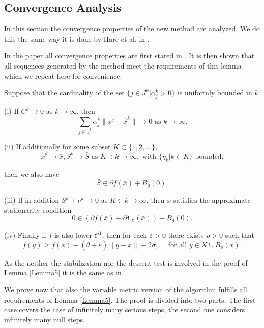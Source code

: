 \vspace{1.5em}


\subsection{Convergence Analysis}

In this section the convergence properties of the new method are analyzed. We do this the same way it is done by Hare et al. in \cite{Hare2016}.

In the paper all convergence properties are first stated in \cite[Lemma 5]{Hare2016}. It is then shown that all sequences generated by the method meet the requirements of this lemma which we repeat here for convenience.

\begin{lemma}\label{Lemma5}
	Suppose that the cardinality of the set \(\{j \in J^k| \alpha_j^k > 0\}\) is uniformly bounded in \(k\).
	
	(i) If \(C^k \to 0\) as \(k \to \infty\), then 
	\[ \sum_{j \in J^k}\alpha_j^k\|x^j-\hat{x}^k\| \to 0 \text{ as } k \to \infty. \]
	
	(ii) If additionally for some subset \(K \subset \{1,2,\dots\}\),
	\[\hat{x}^k \to \bar{x}, S^k \to \bar{S} \text{ as } K \ni k \to \infty, \text{ with } \{\eta_k|k \in K\} \text{ bounded,} \]
	
	then we also have 
	\[\bar{S} \in \partial f(\bar{x})+B_{\bar{\theta}}(0).\]
	
	(iii) If in addition \(S^k + \nu^k \to 0\) as \(K \in k \to \infty\), then \(\bar{x}\) satisfies the approximate stationarity condition 
	\begin{equation}
		0 \in \left(\partial f(\bar{x}) + \partial \mathtt{i}_X(\bar{x}) \right) + B_{\bar{\theta}}(0).
	\end{equation}
	
	(iv) Finally if \(f\) is also lower-\(\mathcal{C}^1\), then for each \(\varepsilon > 0\) there exists \(\rho > 0\) such that
	\begin{equation}
		f(y) \geq f(\bar{x})-(\bar{\theta}+\varepsilon)\|y-\bar{x}\|-2\bar{\sigma}, \quad \text{ for all } y \in X\cup B_{\rho}(\bar{x}).
	\end{equation}
\end{lemma}

As the neither the stabilization nor the descent test is involved in the proof of Lemma \ref{Lemma5} it is the same as in \cite{Hare2016}.

We prove now that also the variable metric version of the algorithm fulfills all requirements of Lemma \ref{Lemma5}.
The proof is divided into two parts. The first case covers the case of infinitely many serious steps, the second one considers infinitely many null steps.

